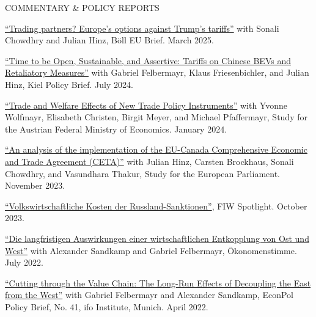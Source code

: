 \documentclass{article}
\begin{document}
\begin{minipage}[t]{0.12\textwidth}
    {\selectfont COMMENTARY \& POLICY REPORTS} \\
\end{minipage}
\hspace{5mm}
\begin{minipage}[t]{0.8\textwidth}
    \href{https://eu.boell.org/sites/default/files/2025-03/2025_hbs_eu_policy_brief_trade_final.pdf}{``Trading partners? Europe's options against Trump's tariffs''} with Sonali Chowdhry and Julian Hinz, Böll EU Brief. March 2025.\par
    \href{https://www.ifw-kiel.de/publications/time-to-be-open-sustainable-and-assertive-tariffs-on-chinese-bevs-and-retaliatory-measures-33083/}{``Time to be Open, Sustainable, and Assertive: Tariffs on Chinese BEVs and Retaliatory Measures''} with Gabriel Felbermayr, Klaus Friesenbichler, and Julian Hinz, Kiel Policy Brief. July 2024.\par
    \href{https://www.fiw.ac.at/publications/trade-and-welfare-effects-of-new-trade-policy-instruments/}{``Trade and Welfare Effects of New Trade Policy Instruments''} with Yvonne Wolfmayr, Elisabeth Christen, Birgit Meyer, and Michael Pfaffermayr, Study for the Austrian Federal Ministry of Economics. January 2024.\par
    \href{https://www.europarl.europa.eu/RegData/etudes/IDAN/2023/754440/EXPO_IDA(2023)754440_EN.pdf}{``An analysis of the implementation of the EU-Canada Comprehensive Economic and Trade Agreement (CETA)''} with Julian Hinz, Carsten Brockhaus, Sonali Chowdhry, and Vasundhara Thakur, Study for the European Parliament. November 2023. \par
    \href{https://www.fiw.ac.at/2023/10/02/volkswirtschaftliche-kosten-der-russland-sanktionen/}{``Volkswirtschaftliche Kosten der Russland-Sanktionen''}, FIW Spotlight. October 2023. \par
    \href{https://www.oekonomenstimme.org/artikel/2022/07/die-langfristigen-auswirkungen-einer-wirtschaftlichen-entkopplung-von-ost-und-west/}{``Die langfristigen Auswirkungen einer wirtschaftlichen Entkopplung von Ost und West''} with Alexander Sandkamp and Gabriel Felbermayr, Ökonomenstimme. July 2022. \par
    \href{https://www.cesifo.org/en/publikationen/2022/working-paper/cutting-through-value-chain-long-run-effects-decoupling-east-west}{``Cutting through the Value Chain: The Long-Run Effects of Decoupling the East from the West''} with Gabriel Felbermayr and Alexander Sandkamp, EconPol Policy Brief, No. 41, ifo Institute, Munich. April 2022. \par

\end{minipage}
\end{document}
